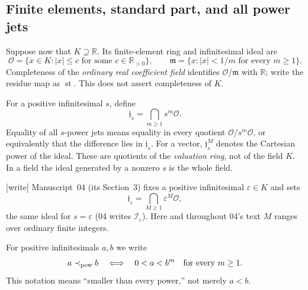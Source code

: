 \documentclass[11pt,a4paper]{article}
\numberwithin{equation}{section}
\theoremstyle{plain}
\newcommand{\wtag}{\textup{[write]}}%
\newcommand{\R}{\mathbb R}
\newcommand{\eps}{\varepsilon}
\newcommand{\st}{\operatorname{st}}
\newcommand{\OO}{\mathcal O}
\newcommand{\mm}{\mathfrak m}
\newcommand{\JJ}{\mathfrak j}
\newcommand{\powprec}{\mathrel{\prec_{\mathrm{pow}}}}
\begin{document}
\subsection{Finite elements, standard part, and all power jets}
Suppose now that $K\supseteq\R$. Its finite-element ring and infinitesimal
ideal are
\[
 \OO=\{x\in K:|x|\leq c\text{ for some }c\in\R_{>0}\},\qquad
 \mm=\{x:|x|<1/m\text{ for every }m\geq1\}.
\]
Completeness of the \emph{ordinary real coefficient field} identifies
$\OO/\mm$ with $\R$; write the residue map as $\st$. This does not assert
completeness of $K$.

For a positive infinitesimal $s$, define
\begin{equation}\label{poly:ic:eq:flatideal}
 \JJ_s=\bigcap_{m\geq1}s^m\OO.
\end{equation}
Equality of all $s$-power jets means equality in every quotient
$\OO/s^m\OO$, or equivalently that the difference lies in $\JJ_s$.
For a vector, $\JJ_s^M$ denotes the Cartesian power of the ideal.
These are quotients of the \emph{valuation ring}, not of the field $K$.
In a field the ideal generated by a nonzero $s$ is the whole field.

\wtag{} Manuscript~04 (its Section~3) fixes a positive infinitesimal
$\eps\in K$ and sets
\begin{equation}\label{poly:bao:eq:flatideal}
 \JJ_\eps=\bigcap_{M\geq1}\eps^M\OO,
\end{equation}
the same ideal for $s=\eps$ (04 writes $\mathcal I_\eps$). Here and
throughout 04's text $M$ ranges over ordinary finite integers.

For positive infinitesimals $a,b$ we write
\[
 a\powprec b\quad\Longleftrightarrow\quad
              0<a<b^m\quad\hbox{for every }m\geq1.
\]
This notation means ``smaller than every power,'' not merely $a<b$.
\end{document}
